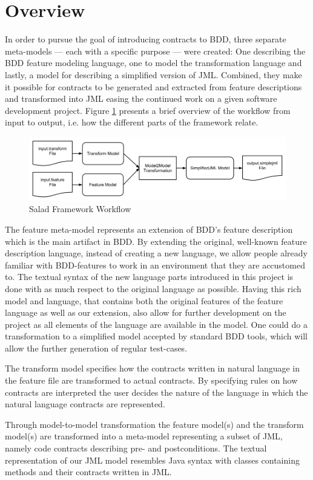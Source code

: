 \section{Overview}
In order to pursue the goal of introducing contracts to BDD, three separate meta-models --- each with a specific purpose --– were created: One describing the BDD feature modeling language, one to model the transformation language and lastly, a model for describing a simplified version of JML.  Combined, they make it possible for contracts to be generated and extracted from feature descriptions and transformed into JML easing the continued work on a given software development project. Figure \ref{fig:overview} presents a brief overview of the workflow from input to output, i.e. how the different parts of the framework relate.

\begin{figure}[h]
	\begin{center}
		\includegraphics[scale=0.46]{images/framework_overview.png}
	\end{center}
	\caption{Salad Framework Workflow}
	\label{fig:overview}
\end{figure}

The feature meta-model represents an extension of BDD’s feature description which is the main artifact in BDD. By extending the original, well-known feature description language, instead of creating a new language, we allow people already familiar with BDD-features to work in an environment that they are accustomed to. The textual syntax of the new language parts introduced in this project is done with as much respect to the original language as possible. Having this rich model and language, that contains both the original features of the feature language as well as our extension, also allow for further development on the project as all elements of the language are available in the model. One could do a transformation to a simplified model accepted by standard BDD tools, which will allow the further generation of regular test-cases.

The transform model specifies how the contracts written in natural language in the feature file are transformed to actual contracts. By specifying rules on how contracts are interpreted the user decides the nature of the language in which the natural language contracts are represented. 

Through model-to-model transformation the feature model(s) and the transform model(s) are transformed into a meta-model representing a subset of JML, namely code contracts describing pre- and postconditions. The textual representation of our JML model resembles Java syntax with classes containing methods and their contracts written in JML.
